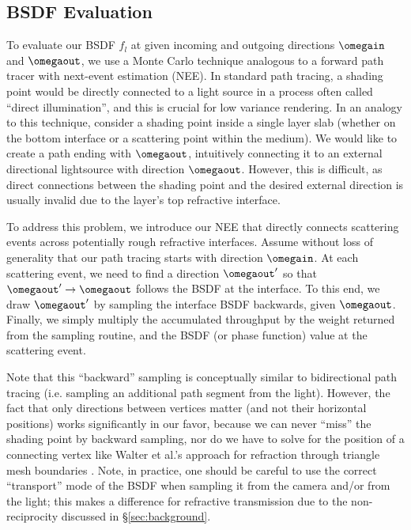 \subsection{BSDF Evaluation}
\label{subsec:ours_eval}
%
To evaluate our BSDF $f_l$ at given incoming and outgoing directions $\omegain$ and $\omegaout$, we use a Monte Carlo technique analogous to a forward path tracer with next-event estimation (NEE). In standard path tracing, a shading point would be directly connected to a light source in a process often called ``direct illumination'', and this is crucial for low variance rendering. In an analogy to this technique, consider a shading point inside a single layer slab (whether on the bottom interface or a scattering point within the medium). We would like to create a path ending with $\omegaout$, intuitively connecting it to an external directional lightsource with direction $\omegaout$. However, this is difficult, as direct connections between the shading point and the desired external direction is usually invalid due to the layer's top refractive interface.

To address this problem, we introduce our NEE that directly connects scattering events across potentially rough refractive interfaces. Assume without loss of generality that our path tracing starts with direction $\omegain$. At each scattering event, we need to find a direction $\omegaout'$ so that $\omegaout' \to \omegaout$ follows the BSDF at the interface.
To this end, we draw $\omegaout'$ by sampling the interface BSDF backwards, given $\omegaout$. Finally, we simply multiply the accumulated throughput by the weight returned from the sampling routine, and the BSDF (or phase function) value at the scattering event.

Note that this ``backward'' sampling is conceptually similar to bidirectional path tracing (i.e. sampling an additional path segment from the light). However, the fact that only directions between vertices matter (and not their horizontal positions) works significantly in our favor, because we can never ``miss'' the shading point by backward sampling, nor do we have to solve for the position of a connecting vertex like Walter et al.'s approach for refraction through triangle mesh boundaries . Note, in practice, one should be careful to use the correct ``transport'' mode of the BSDF when sampling it from the camera and/or from the light; this makes a difference for refractive transmission due to the non-reciprocity discussed in \S\ref{sec:background}.

